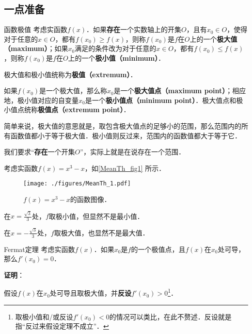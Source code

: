 

\subsection{一点准备}

\begin{definition}{函数极值}
考虑实函数$f(x)$．如果\textbf{存在}一个实数轴上的开集$O$，且有$x_0\in O$，使得对于任意的$x\in O$，都有$f(x_0)\geq f(x)$，则称$f(x_0)$是$f$在$O$上的一个\textbf{极大值（maximum）}；如果$x_0$满足的条件改为对于任意的$x\in O$，都有$f(x_0)\leq f(x)$，则称$f(x_0)$是$f$在$O$上的一个\textbf{极小值（minimum）}．

极大值和极小值统称为\textbf{极值（extremum）}．

如果$f(x_0)$是一个极大值，那么称$x_0$是一个\textbf{极大值点（maximum point）}；相应地，极小值对应的自变量$x_0$是一个\textbf{极小值点（minimum point）}．极大值点和极小值点统称\textbf{极值点（extremum point）}．
\end{definition}


简单来说，极大值的意思就是，取包含极大值点的足够小的范围，那么范围内的所有函数值都小于等于极大值．极小值则反过来，范围内的函数值都大于等于它．

我们要求“\textbf{存在}一个开集$O$”，实际上就是在说存在一个范围．

\begin{example}{}\label{MeanTh_ex1}
考虑实函数$f(x)=x^3-x$，如\autoref{MeanTh_fig1} 所示．

\begin{figure}[ht]
\centering
\texttt{[image: ./figures/MeanTh\_1.pdf]}
\caption{$f(x)=x^3-x$的函数图像．} \label{MeanTh_fig1}
\end{figure}

在$x=\frac{\sqrt{3}}{3}$处，$f$取极小值，但显然不是最小值．

在$x=-\frac{\sqrt{3}}{3}$处，$f$取极大值，也显然不是最大值．


\end{example}


\begin{theorem}{Fermat定理}\label{MeanTh_the1}
考虑实函数$f(x)$．如果$x_0$是$f$的一个极值点，且$f(x)$在$x_0$处可导，那么$f'(x_0)=0$．
\end{theorem}

\textbf{证明}：

假设$f(x)$在$x_0$处可导且取极大值，并\textbf{反设}$f'(x_0)>0$\footnote{取极小值和/或反设$f'(x_0)<0$的情况可以类比，在此不赘述．反设就是指“反过来假设定理不成立”．}．

